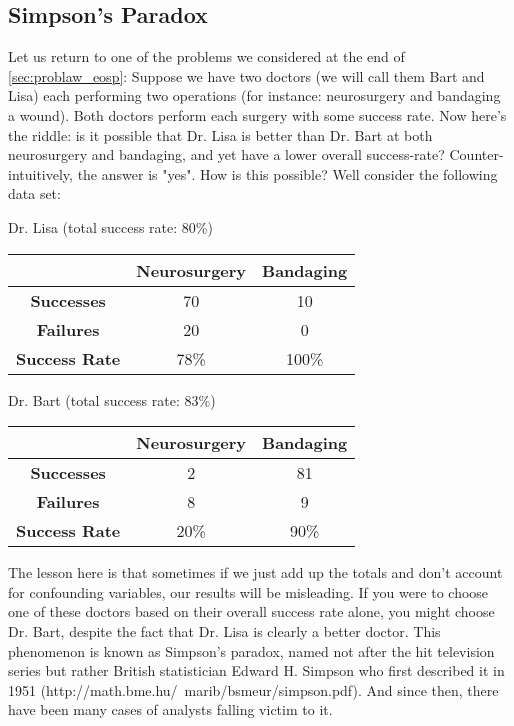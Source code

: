 \documentclass{report}
\begin{document}
\subsection{Simpson's Paradox}
Let us return to one of the problems we considered at the end of \ref{sec:problaw_eosp}: Suppose we have two doctors (we will call them Bart and Lisa) each performing two operations (for instance: neurosurgery and bandaging a wound). Both doctors perform each surgery with some success rate. Now here's the riddle: is it possible that Dr. Lisa is better than Dr. Bart at both neurosurgery and bandaging, and yet have a lower overall success-rate? Counter-intuitively, the answer is "yes". How is this possible? Well consider the following data set:
\vspace{15px}
\begin{center}
Dr. Lisa (total success rate: 80\%)\\
\vspace{5px}
\begin{tabular}{c|cc }
& \textbf{Neurosurgery} & \textbf{Bandaging} \\ 
\hline
\textbf{Successes} & 70 & 10 \\  
\textbf{Failures} & 20 & 0 \\
\hline
\textbf{Success Rate} & 78\% & 100\% 
\end{tabular}
\end{center}

\vspace{15px}
\begin{center}
Dr. Bart (total success rate: 83\%)\\
\vspace{5px}
\begin{tabular}{c|cc}
&\textbf{Neurosurgery} & \textbf{Bandaging} \\ 
\hline
\textbf{Successes} & 2 & 81 \\  
\textbf{Failures} & 8 & 9 \\
\hline
\textbf{Success Rate} & 20\% & 90\% 
\end{tabular}
\vspace{15px}
\end{center}

The lesson here is that sometimes if we just add up the totals and don't account for confounding variables, our results will be misleading. If you were to choose one of these doctors based on their overall success rate alone, you might choose Dr. Bart, despite the fact that Dr. Lisa is clearly a better doctor. This phenomenon is known as Simpson's paradox, named not after the hit television series but rather British statistician Edward H. Simpson who first described it in 1951 (\todo http://math.bme.hu/~marib/bsmeur/simpson.pdf). And since then, there have been many cases of analysts falling victim to it.
\end{document}
